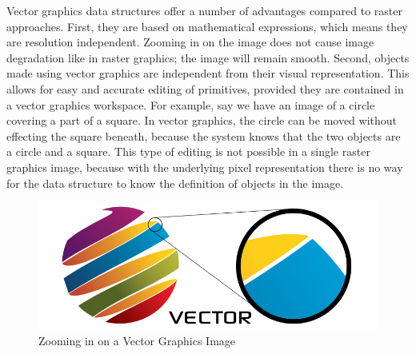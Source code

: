 \documentclass[11pt]{report}
\begin{document}
Vector graphics data structures offer a number of advantages compared to raster approaches. 
First, they are based on mathematical expressions, which means they are resolution independent.
Zooming in on the image does not cause image degradation like in raster graphics; the image will remain smooth. 
Second, objects made using vector graphics are independent from their visual representation.
This allows for easy and accurate editing of primitives, provided they are contained in a vector graphics workspace.
For example, say we have an image of a circle covering a part of a square. In vector graphics, the circle can be moved without effecting the square beneath, because the system knows that the two objects are a circle and a square.
This type of editing is not possible in a single raster graphics image, because with the underlying pixel representation there is no way for the data structure to know the definition of objects in the image.
 

\begin{figure}
\includegraphics[width=\textwidth]{vector.jpg}
\caption{Zooming in on a Vector Graphics Image}
\end{figure}
\end{document}
